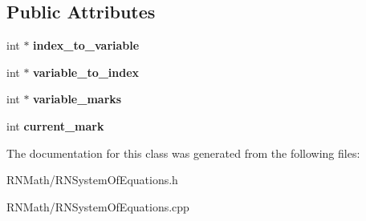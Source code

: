 \subsection*{Public Attributes}
\begin{DoxyCompactItemize}
\item 
int $\ast$ {\bfseries index\+\_\+to\+\_\+variable}\hypertarget{class_r_n_system_of_equations_a873cae55ed0c5c4083f0d772ed40f45e}{}\label{class_r_n_system_of_equations_a873cae55ed0c5c4083f0d772ed40f45e}

\item 
int $\ast$ {\bfseries variable\+\_\+to\+\_\+index}\hypertarget{class_r_n_system_of_equations_a59af6fdf3722e3a53dad73914a5ada66}{}\label{class_r_n_system_of_equations_a59af6fdf3722e3a53dad73914a5ada66}

\item 
int $\ast$ {\bfseries variable\+\_\+marks}\hypertarget{class_r_n_system_of_equations_abb59a595aa99915590d6c9cec5043c78}{}\label{class_r_n_system_of_equations_abb59a595aa99915590d6c9cec5043c78}

\item 
int {\bfseries current\+\_\+mark}\hypertarget{class_r_n_system_of_equations_ab08c10ed944d56c49170b59d486306f0}{}\label{class_r_n_system_of_equations_ab08c10ed944d56c49170b59d486306f0}

\end{DoxyCompactItemize}


The documentation for this class was generated from the following files\+:\begin{DoxyCompactItemize}
\item 
R\+N\+Math/R\+N\+System\+Of\+Equations.\+h\item 
R\+N\+Math/R\+N\+System\+Of\+Equations.\+cpp\end{DoxyCompactItemize}
